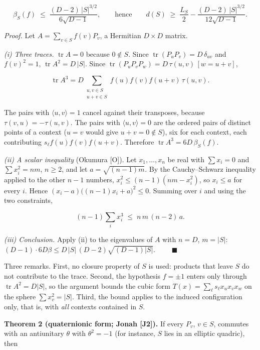 \documentclass[11pt,a4paper]{article}
\begin{document}
\[\beta_S(f) \;\le\; \frac{(D-2)\,|S|^{3/2}}{6\sqrt{D-1}},
\qquad\text{hence}\qquad
d(S) \;\ge\; \frac{L_S}{2} - \frac{(D-2)\,|S|^{3/2}}{12\sqrt{D-1}} .\]

\emph{Proof.} Let \(A = \sum_{v \in S} f(v) P_v\), a Hermitian \(D \times D\) matrix.

\emph{(i) Three traces.} \(\operatorname{tr} A = 0\) because \(0 \notin S\). Since
\(\operatorname{tr}(P_u P_v) = D\,\delta_{uv}\) and \(f(v)^2 = 1\), \(\operatorname{tr} A^2 = D\,|S|\). Since
\(\operatorname{tr}(P_u P_v P_w) = D\,\tau(u,v)\,[w = u+v]\),

\[\operatorname{tr} A^3 = D \sum_{\substack{u, v \in S \\ u+v \in S}} f(u) f(v) f(u+v)\, \tau(u,v).\]

The pairs with \(\langle u,v\rangle = 1\) cancel against their transposes, because \(\tau(v,u) = -\tau(u,v)\).
The pairs with \(\langle u,v \rangle = 0\) are the ordered pairs of distinct points of a context
(\(u = v\) would give \(u + v = 0 \notin S\)), six for each context, each contributing \(s_\ell f(u)f(v)f(u+v)\).
Therefore \(\operatorname{tr} A^3 = 6 D\, \beta_S(f)\).

\emph{(ii) A scalar inequality} (Okumura {[}O{]}). Let \(x_1, \dots, x_n\) be real with \(\sum x_i = 0\) and
\(\sum x_i^2 = n m\), \(n \ge 2\), and let \(a = \sqrt{(n-1)m}\). By the Cauchy--Schwarz inequality applied to
the other \(n-1\) numbers, \(x_i^2 \le (n-1)(nm - x_i^2)\), so \(x_i \le a\) for every \(i\). Hence
\((x_i - a)\big((n-1)x_i + a\big)^2 \le 0\). Summing over \(i\) and using the two constraints,

\[(n-1) \sum_i x_i^3 \;\le\; n\, m\, (n-2)\, a .\]

\emph{(iii) Conclusion.} Apply (ii) to the eigenvalues of \(A\) with \(n = D\), \(m = |S|\):
\((D-1) \cdot 6 D \beta \le D\,|S|\,(D-2)\sqrt{(D-1)|S|}\). \(\qquad\blacksquare\)

Three remarks. First, no closure property of \(S\) is used: products that leave \(S\) do not contribute to
the trace. Second, the hypothesis \(f = \pm 1\) enters only through \(\operatorname{tr} A^2 = D|S|\), so the
argument bounds the cubic form \(T(x) = \sum_\ell s_\ell x_u x_v x_w\) on the sphere \(\sum x_v^2 = |S|\).
Third, the bound applies to the induced configuration only, that is, with \emph{all} contexts contained
in \(S\).

\textbf{Theorem 2 (quaternionic form; Jonah {[}J2{]}).} If every \(P_v\), \(v \in S\), commutes with an
antiunitary \(\theta\) with \(\theta^2 = -1\) (for instance, \(S\) lies in an elliptic quadric), then
\end{document}
